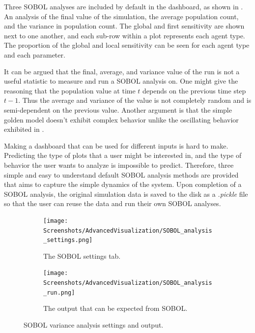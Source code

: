 Three SOBOL analyses are included by default in the dashboard, as shown in .
An analysis of the final value of the simulation, the average population count, and the variance in population count.
The global and first sensitivity are shown next to one another, and each sub-row within a plot represents each agent type. 
The proportion of the global and local sensitivity can be seen for each agent type and each parameter.

It can be argued that the final, average, and variance value of the run is not a useful statistic to measure and run a SOBOL analysis on. 
One might give the reasoning that the population value at time $t$ depends on the previous time step $t-1$. 
Thus the average and variance of the value is not completely random and is semi-dependent on the previous value. 
Another argument is that the simple golden model doesn't exhibit complex behavior unlike the oscillating behavior exhibited in . 

Making a dashboard that can be used for different inputs is hard to make. Predicting the type of plots that a user might be interested in, and the type of behavior the user wants to analyze is impossible to predict. 
Therefore, three simple and easy to understand default SOBOL analysis methods are provided that aims to capture the simple dynamics of the system. 
Upon completion of a SOBOL analysis, the original simulation data is saved to the disk as a \textit{.pickle} file so that the user can reuse the data and run their own SOBOL analyses. 

\begin{figure}[h!]
    \centering
    \begin{subfigure}{0.49\linewidth}
        \centering
        \captionsetup{width=1\linewidth}
        \texttt{[image: Screenshots/AdvancedVisualization/SOBOL\_analysis\_settings.png]}
        \caption{
            The SOBOL settings tab. 
        }
        \label{fig:ss:av:SOBOL_analysis_settings}
    \end{subfigure}
    \hfill
    \begin{subfigure}{0.49\linewidth}
        \centering
        \captionsetup{width=1\linewidth}
        \texttt{[image: Screenshots/AdvancedVisualization/SOBOL\_analysis\_run.png]}
        \caption{
            The output that can be expected from SOBOL. 
        }
        \label{fig:ss:av:SOBOL_analysis_run}
    \end{subfigure}
    \caption{SOBOL variance analysis settings and output. }
\end{figure}

